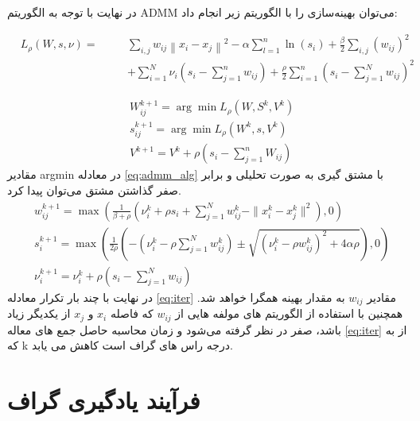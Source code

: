 \documentclass[12pt,onecolumn,a4paper]{article}
\begin{document}
	در نهایت با توجه به الگوریتم ADMM می‌توان بهینه‌سازی را با الگوریتم زیر انجام داد:
	
	\begin{equation}\label{eq:opt3}
		\begin{aligned}
			&L_{\rho} (W, s, \nu) = &\quad &\sum_{i,j} w_{ij} \left\| x_i - x_j \right\|^2 - \alpha \sum_{l=1}^{n} \ln (s_i) + \frac{\beta}{2} \sum_{i,j} (w_{ij})^2 \\
			& &\quad &+ \sum_{i=1}^{N} \nu_i \left( s_i - \sum_{j=1}^{n} w_{ij} \right) + \frac{\rho}{2} \sum_{i=1}^{n} \left( s_i - \sum_{j=1}^{N} w_{ij} \right)^2
		\end{aligned}
	\end{equation}
	
	\begin{equation}\label{eq:admm_alg}
		\begin{aligned}
		&W_{ij}^{k+1} = \arg\min L_{\rho} (W, S^k, V^k)\\
		&s_{ij}^{k+1} = \arg\min L_{\rho} (W^k, s, V^k)\\
		&V^{k+1} = V^k + \rho \left( s_i - \sum_{j=1}^{n} W_{ij} \right)
	\end{aligned}
	\end{equation}
	 مقادیر argmin در معادله \ref{eq:admm_alg} با مشتق گیری به صورت تحلیلی و برابر صفر گذاشتن مشتق می‌توان پیدا کرد.
	 \begin{equation}\label{eq:iter}
	 	\begin{aligned}
	 	&w_{ij}^{k+1} = \max \left( \frac{1}{\beta + \rho} \left( \nu_i^k + \rho s_i + \sum_{j=1}^{N} w_{ij}^k - \|x_i^k - x_j^k\|^2 \right), 0 \right) \\
	 	&s_i^{k+1} = \max \left( \frac{1}{2\rho} \left( -\left( \nu_i^k - \rho \sum_{j=1}^{N} w_{ij}^k \right) \pm \sqrt{\left( \nu_i^k - \rho w_{ij}^k \right)^2 + 4\alpha \rho} \right), 0 \right) \\
	 	&\nu_i^{k+1} = \nu_i^k + \rho \left( s_i - \sum_{j=1}^{N} w_{ij} \right)
	 	\end{aligned}
	 \end{equation}
	 	در نهایت با چند بار تکرار معادله \ref{eq:iter} مقادیر $w_{ij}$ به مقدار بهینه همگرا خواهد شد. همچنین با استفاده از الگوریتم های
	 	  مولفه هایی از $w_{ij}$ که فاصله $x_i$ و $x_j$ از یکدیگر زیاد باشد، صفر در نظر گرفته می‌شود و زمان محاسبه حاصل جمع های معاله \ref{eq:iter} از
	 	    به 
	 	     که k درجه راس های گراف است کاهش می یابد.
	
	\section{فرآیند یادگیری گراف}
	
\end{document}
